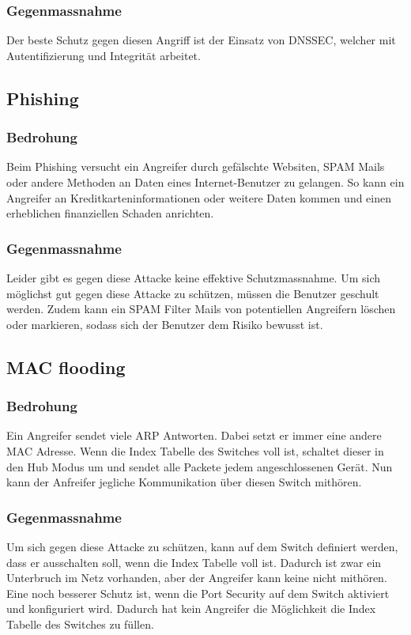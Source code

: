 \documentclass[11pt,a4paper,parskip=half]{scrartcl}
\begin{document}
\subsubsection{Gegenmassnahme}
Der beste Schutz gegen diesen Angriff ist der Einsatz von DNSSEC, welcher mit Autentifizierung und Integrität arbeitet.
\subsection{Phishing}
\subsubsection{Bedrohung}
Beim Phishing versucht ein Angreifer durch gefälschte Websiten, SPAM Mails oder andere Methoden an Daten eines Internet-Benutzer zu gelangen. So kann ein Angreifer an Kreditkarteninformationen oder weitere Daten kommen und einen erheblichen finanziellen Schaden anrichten.
\subsubsection{Gegenmassnahme}
Leider gibt es gegen diese Attacke keine effektive Schutzmassnahme. Um sich möglichst gut gegen diese Attacke zu schützen, müssen die Benutzer geschult werden. Zudem kann ein SPAM Filter Mails von potentiellen Angreifern löschen oder markieren, sodass sich der Benutzer dem Risiko bewusst ist.

\subsection{MAC flooding}
\subsubsection{Bedrohung}
Ein Angreifer sendet viele ARP Antworten. Dabei setzt er immer eine andere MAC Adresse. Wenn die Index Tabelle des Switches voll ist, schaltet dieser in den Hub Modus um und sendet alle Packete jedem angeschlossenen Gerät. Nun kann der Anfreifer jegliche Kommunikation über diesen Switch mithören. 
\subsubsection{Gegenmassnahme}
Um sich gegen diese Attacke zu schützen, kann auf dem Switch definiert werden, dass er ausschalten soll, wenn die Index Tabelle voll ist. Dadurch ist zwar ein Unterbruch im Netz vorhanden, aber der Angreifer kann keine nicht mithören.\\
Eine noch besserer Schutz ist, wenn die Port Security auf dem Switch aktiviert und konfiguriert wird. Dadurch hat kein Angreifer die Möglichkeit die Index Tabelle des Switches zu füllen.
\end{document}
